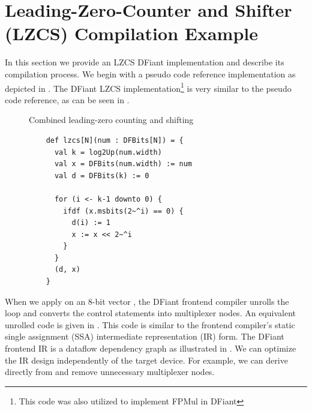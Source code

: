 \section{Leading-Zero-Counter and Shifter (LZCS) Compilation Example}
\label{sec:lzc}
In this section we provide an LZCS DFiant implementation and describe its compilation process. We begin with a pseudo code reference implementation\cite{muller2009handbook} as depicted in . The DFiant LZCS implementation\footnote{This code was also utilized to implement FPMul in DFiant} is very similar to the pseudo code reference, as can be seen in .
\begin{figure}[h]
\begin{algorithm}[H]
  \caption*{Combined leading-zero counting and shifting}
  \begin{algorithmic}
    \small
    
    \ELSE 
    \ENDIF
    \ENDFOR
  \end{algorithmic}
\end{algorithm}
\label{fig:LZC_pseudo_code}
\end{figure}

\begin{figure}[h]
  \begin{verbatim}
    def lzcs[N](num : DFBits[N]) = {
      val k = log2Up(num.width)
      val x = DFBits(num.width) := num
      val d = DFBits(k) := 0
      
      for (i <- k-1 downto 0) {
        ifdf (x.msbits(2~^i) == 0) {
          d(i) := 1
          x := x << 2~^i
        }
      }
      (d, x)
    }
  \end{verbatim}
  \label{fig:LZC_DFiant_code}
\end{figure}

When we apply  on an 8-bit vector , the DFiant frontend compiler unrolls the  loop and converts the  control statements into multiplexer nodes. An equivalent unrolled code is given in . This code is similar to the frontend compiler's static single assignment (SSA) intermediate representation (IR) form. The DFiant frontend IR is a dataflow dependency graph as illustrated in . We can optimize the IR design independently of the target device. For example, we can derive  directly from  and remove unnecessary multiplexer nodes.


